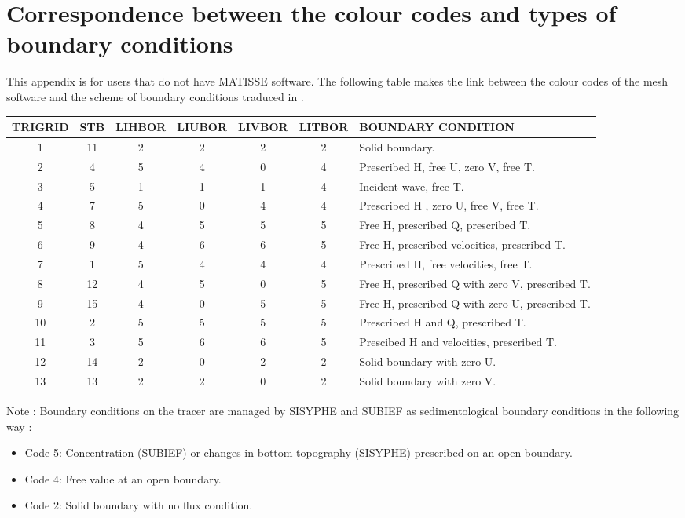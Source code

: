 \chapter{Correspondence between the colour codes and types of boundary conditions}

This appendix is for users that do not have MATISSE software. The following
table makes the link between the colour codes of the mesh software and the
scheme of boundary conditions traduced in \stbtel.\\

\begin{table}[H]
\begin{center}
%
\begin{tabular*}{\textwidth}{ccccccl}
%
\toprule
\toprule
%
TRIGRID & STB & LIHBOR & LIUBOR & LIVBOR & LITBOR & BOUNDARY CONDITION\\
\midrule
1  & 11 & 2 & 2 & 2 & 2 & Solid boundary.\\
2  & 4  & 5 & 4 & 0 & 4 & Prescribed H, free U, zero V, free T.\\
3  & 5  & 1 & 1 & 1 & 4 & Incident wave, free T.\\
4  & 7  & 5 & 0 & 4 & 4 & Prescribed H , zero U, free V, free T.\\
5  & 8  & 4 & 5 & 5 & 5 & Free H, prescribed Q, prescribed T.\\
6  & 9  & 4 & 6 & 6 & 5 & Free H, prescribed velocities, prescribed T.\\
7  & 1  & 5 & 4 & 4 & 4 & Prescribed H, free velocities, free T.\\
8  & 12 & 4 & 5 & 0 & 5 & Free H, prescribed Q with zero V, prescribed T.\\
9  & 15 & 4 & 0 & 5 & 5 & Free H, prescribed Q with zero U, prescribed T.\\
10 & 2  & 5 & 5 & 5 & 5 & Prescribed H and Q, prescribed T.\\
11 & 3  & 5 & 6 & 6 & 5 & Prescibed H and velocities, prescribed T.\\
12 & 14 & 2 & 0 & 2 & 2 & Solid boundary with zero U.\\
13 & 13 & 2 & 2 & 0 & 2 & Solid boundary with zero V.\\
\bottomrule
\end{tabular*}
%
\end{center}
\end{table}
Note : Boundary conditions on the tracer are managed by SISYPHE and SUBIEF as
sedimentological boundary conditions in the following way :
\begin{itemize}
\item Code 5: Concentration (SUBIEF) or changes in bottom topography
(SISYPHE) prescribed on an open boundary.
\item Code 4: Free value at an open boundary.
\item Code 2: Solid boundary with no flux condition.
\end{itemize}
